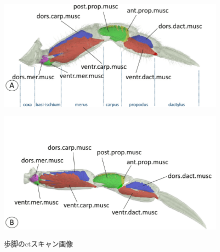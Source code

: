 \begin{figure}[t]
%
  \begin{minipage}{0.45\hsize}
    \centering
    \vspace{5mm}
    \includegraphics[scale=0.5]{image/crabct2.PNG}
    \label{fig:ct1}
  \end{minipage}
  \begin{minipage}{0.45\hsize}
    \centering
    \includegraphics[scale=0.5]{image/crabct1.PNG}
    \label{fig:ct2}
  \end{minipage}
  \caption{歩脚のctスキャン画像\cite{HAZERLI2020100972}}
  \label{fig:ct}
%
\end{figure}





